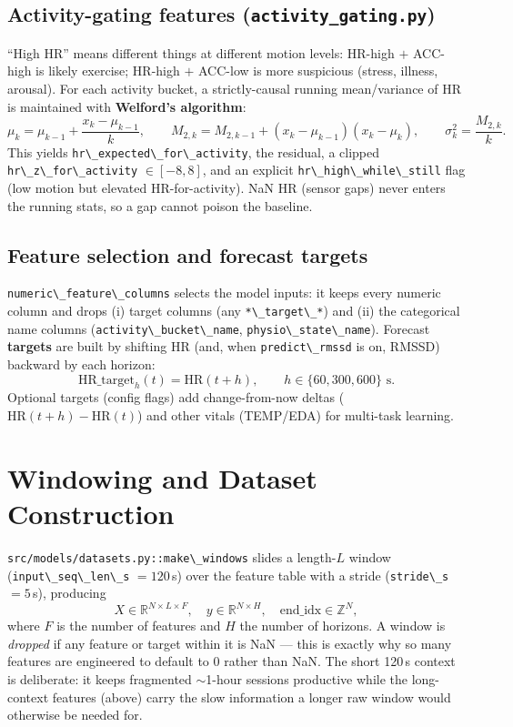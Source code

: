 \documentclass[11pt,a4paper]{article}
\newcommand{\code}[1]{\lstinline[basicstyle=\ttfamily\normalsize]!#1!}
\begin{document}
\subsection{Activity-gating features (\texttt{activity\_gating.py})}
``High HR'' means different things at different motion levels: HR-high $+$
ACC-high is likely exercise; HR-high $+$ ACC-low is more suspicious (stress,
illness, arousal). For each activity bucket, a strictly-causal running mean/variance
of HR is maintained with \textbf{Welford's algorithm}:
\[
\mu_k=\mu_{k-1}+\frac{x_k-\mu_{k-1}}{k},\qquad
M_{2,k}=M_{2,k-1}+(x_k-\mu_{k-1})(x_k-\mu_k),\qquad
\sigma_k^2=\frac{M_{2,k}}{k}.
\]
This yields \code{hr\_expected\_for\_activity}, the residual, a clipped
\code{hr\_z\_for\_activity} $\in[-8,8]$, and an explicit
\code{hr\_high\_while\_still} flag (low motion but elevated HR-for-activity).
NaN HR (sensor gaps) never enters the running stats, so a gap cannot poison the
baseline.

\subsection{Feature selection and forecast targets}
\code{numeric\_feature\_columns} selects the model inputs: it keeps every numeric
column and drops (i) target columns (any \code{*\_target\_*}) and (ii) the
categorical name columns (\code{activity\_bucket\_name},
\code{physio\_state\_name}). Forecast \textbf{targets} are built by shifting HR
(and, when \code{predict\_rmssd} is on, RMSSD) backward by each horizon:
\[
\text{HR\_target}_h(t)=\text{HR}(t+h),\qquad h\in\{60,300,600\}\text{ s}.
\]
Optional targets (config flags) add change-from-now deltas
($\text{HR}(t+h)-\text{HR}(t)$) and other vitals (TEMP/EDA) for multi-task
learning.

\section{Windowing and Dataset Construction}\label{sec:windows}

\code{src/models/datasets.py::make\_windows} slides a length-$L$ window
(\code{input\_seq\_len\_s} $=120$\,s) over the feature table with a stride
(\code{stride\_s} $=5$\,s), producing
\[
X\in\mathbb{R}^{N\times L\times F},\quad
y\in\mathbb{R}^{N\times H},\quad
\text{end\_idx}\in\mathbb{Z}^{N},
\]
where $F$ is the number of features and $H$ the number of horizons. A window is
\emph{dropped} if any feature or target within it is NaN --- this is exactly why
so many features are engineered to default to 0 rather than NaN. The short
120\,s context is deliberate: it keeps fragmented $\sim$1-hour sessions
productive while the long-context features (above) carry the slow information a
longer raw window would otherwise be needed for.
\end{document}
